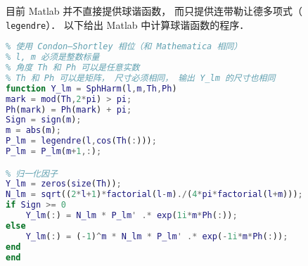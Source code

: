 
目前 Matlab 并不直接提供球谐函数， 而只提供连带勒让德多项式（ \lstinline|legendre|）． 以下给出 Matlab 中计算球谐函数的程序．

\begin{lstlisting}[language=matlab]
% 计算球谐函数 Y_{lm}
% 使用 Condon–Shortley 相位（和 Mathematica 相同）
% l, m 必须是整数标量
% 角度 Th 和 Ph 可以是任意实数
% Th 和 Ph 可以是矩阵， 尺寸必须相同， 输出 Y_lm 的尺寸也相同
function Y_lm = SphHarm(l,m,Th,Ph)
mark = mod(Th,2*pi) > pi;
Ph(mark) = Ph(mark) + pi;
Sign = sign(m);
m = abs(m);
P_lm = legendre(l,cos(Th(:)));
P_lm = P_lm(m+1,:);

% 归一化因子
Y_lm = zeros(size(Th));
N_lm = sqrt((2*l+1)*factorial(l-m)./(4*pi*factorial(l+m)));
if Sign >= 0
    Y_lm(:) = N_lm * P_lm' .* exp(1i*m*Ph(:));
else
    Y_lm(:) = (-1)^m * N_lm * P_lm' .* exp(-1i*m*Ph(:));
end
end
\end{lstlisting}
